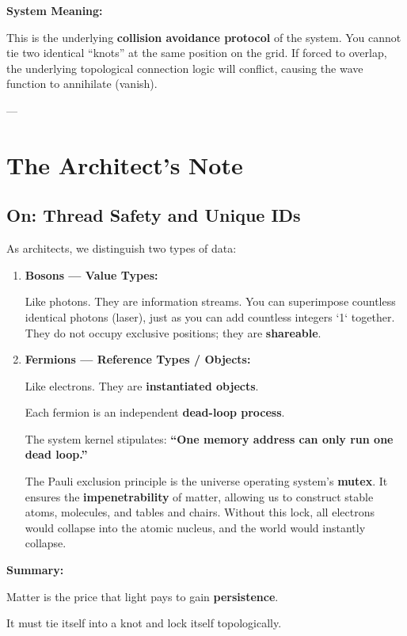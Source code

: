 \textbf{System Meaning:}

This is the underlying \textbf{collision avoidance protocol} of the system. You cannot tie two identical ``knots'' at the same position on the grid. If forced to overlap, the underlying topological connection logic will conflict, causing the wave function to annihilate (vanish).

---

\section{The Architect's Note}

\subsection{On: Thread Safety and Unique IDs}

As architects, we distinguish two types of data:

\begin{enumerate}
\item \textbf{Bosons --- Value Types:}

    Like photons. They are information streams. You can superimpose countless identical photons (laser), just as you can add countless integers `1` together. They do not occupy exclusive positions; they are \textbf{shareable}.

\item \textbf{Fermions --- Reference Types / Objects:}

    Like electrons. They are \textbf{instantiated objects}.

    Each fermion is an independent \textbf{dead-loop process}.

    The system kernel stipulates: \textbf{``One memory address can only run one dead loop.''}

    The Pauli exclusion principle is the universe operating system's \textbf{mutex}. It ensures the \textbf{impenetrability} of matter, allowing us to construct stable atoms, molecules, and tables and chairs. Without this lock, all electrons would collapse into the atomic nucleus, and the world would instantly collapse.
\end{enumerate}

\textbf{Summary:}

Matter is the price that light pays to gain \textbf{persistence}.

It must tie itself into a knot and lock itself topologically.

